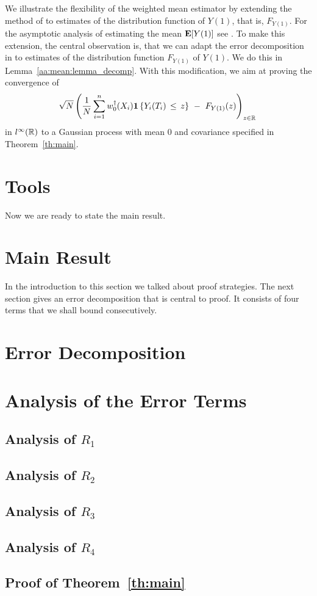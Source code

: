 We illustrate the flexibility of 
the weighted mean estimator by 
extending the method of \cite{Wang2019} to
estimates of 
the distribution function of $Y(1)$, that is, $F_{Y(1)}$.
For the asymptotic analysis of estimating the mean $\mathbf{E}[Y(1)]$ see \cite[Proof of Theorem~3]{Wang2019}.
To make this extension, the central observation is, that we can adapt the error decomposition in \cite[page 27]{Wang2019} 
to estimates of the distribution function $F_{Y(1)}$ of $Y(1)$.
We do this in Lemma~\ref{aa:mean:lemma_decomp}.
With this modification, we aim at proving
the convergence of
\begin{gather}
    \sqrt{N}
    \left( 
  \frac{1}{N}
    \sum_{i=1}^{n} 
    w_0^\dagger(X_i)
    \mathbf{1}\left\{ Y_i(T_i)\,\le\, z \right\}
    \ 
    -
    \ 
    F_{Y(1)}(z)
    \right)
    _{z\in\R}
    \,
  \end{gather}
  in
  $l^\infty(\mathbb{R})$
  to a Gaussian process with mean 0 and covariance specified in Theorem~\ref{th:main}.
\section{Tools}
  
Now we are ready to state the main result.
\newpage
\section{Main Result}
  
In the introduction to this section we talked about proof strategies. The next section gives an error decomposition that is central to proof.
It consists of four terms that we shall bound consecutively. 
\section{Error Decomposition}
  
\section{Analysis of the Error Terms}
  \subsection{Analysis of $R_1$}
    
  \subsection{Analysis of $R_2$}
    
  \subsection{Analysis of $R_3$}
    
  \subsection{Analysis of $R_4$}
    
  \subsection{Proof of Theorem~\ref{th:main}}
    
